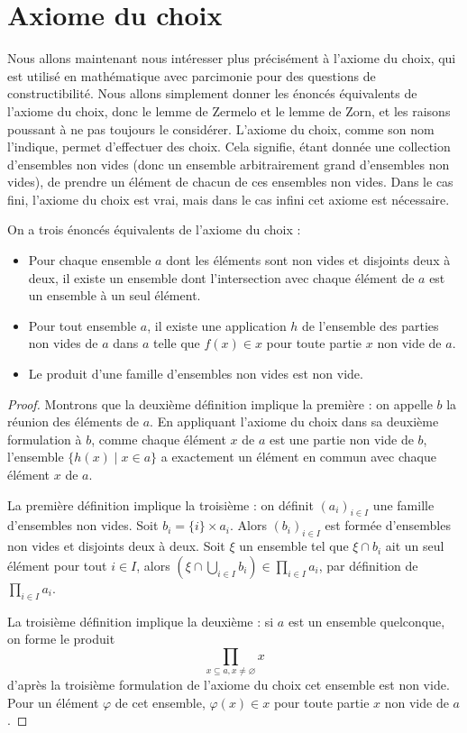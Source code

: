 \section{Axiome du choix}

Nous allons maintenant nous intéresser plus précisément à l'axiome du choix, qui est utilisé en mathématique avec parcimonie pour des questions de constructibilité. Nous allons simplement donner les énoncés équivalents de l'axiome du choix, donc le lemme de Zermelo et le lemme de Zorn, et les raisons poussant à ne pas toujours le considérer. L'axiome du choix, comme son nom l'indique, permet d'effectuer des choix. Cela signifie, étant donnée une collection d'ensembles non vides (donc un ensemble arbitrairement grand d'ensembles non vides), de prendre un élément de chacun de ces ensembles non vides. Dans le cas fini, l'axiome du choix est vrai, mais dans le cas infini cet axiome est nécessaire.

\begin{ax}[Choix]
    On a trois énoncés équivalents de l'axiome du choix :
    \begin{itemize}[label=$\bullet$]
        \item Pour chaque ensemble $a$ dont les éléments sont non vides et disjoints deux à deux, il existe un ensemble dont l'intersection avec chaque élément de $a$ est un ensemble à un seul élément.
        \item Pour tout ensemble $a$, il existe une application $h$ de l'ensemble des parties non vides de $a$ dans $a$ telle que $f(x)\in x$ pour toute partie $x$ non vide de $a$.
        \item Le produit d'une famille d'ensembles non vides est non vide.
    \end{itemize}
\end{ax}

\begin{proof}
    Montrons que la deuxième définition implique la première : on appelle $b$ la réunion des éléments de $a$. En appliquant l'axiome du choix dans sa deuxième formulation à $b$, comme chaque élément $x$ de $a$ est une partie non vide de $b$, l'ensemble $\{h(x)\mid x\in a\}$ a exactement un élément en commun avec chaque élément $x$ de $a$.

    La première définition implique la troisième : on définit $(a_i)_{i\in I}$ une famille d'ensembles non vides. Soit $b_i = \{i\}\times a_i$. Alors $(b_i)_{i\in I}$ est formée d'ensembles non vides et disjoints deux à deux. Soit $\xi$ un ensemble tel que $\xi\cap b_i$ ait un seul élément pour tout $i\in I$, alors $(\xi\cap\bigcup_{i\in I} b_i)\in \prod_{i \in I}a_i$, par définition de $\prod_{i\in I}a_i$.

    La troisième définition implique la deuxième : si $a$ est un ensemble quelconque, on forme le produit $$\prod_{x\subseteq a, x \neq \varnothing} x$$ d'après la troisième formulation de l'axiome du choix cet ensemble est non vide. Pour un élément $\varphi$ de cet ensemble, $\varphi(x)\in x$ pour toute partie $x$ non vide de $a$.
\end{proof}

